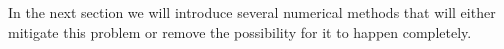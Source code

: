 \documentclass[11pt]{article}
\numberwithin{figure}{section}
\numberwithin{table}{section}
\begin{document}
			In the next section we will introduce several numerical methods that will either mitigate this problem or remove the possibility for it to happen completely.
					
			
 			
%			
%			
\end{document}
